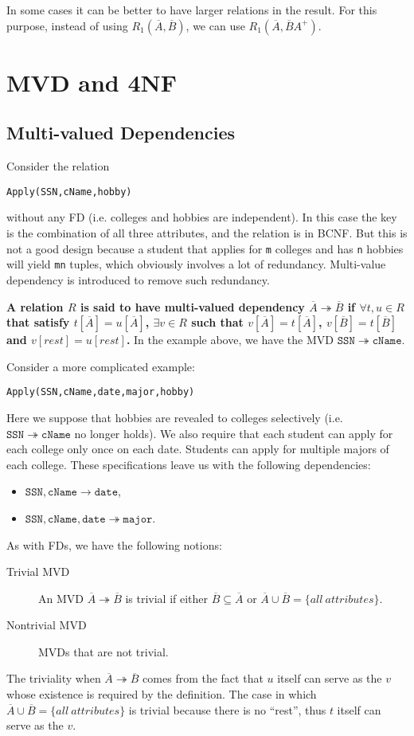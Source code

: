 In some cases it can be better to have larger relations in the result. For this purpose, instead of using $R_1(\overline{A},\overline{B})$, we can use $R_1(\overline{A},\overline{B}A^+)$.
\section{MVD and 4NF}
\subsection{Multi-valued Dependencies}
Consider the relation
\begin{lstlisting}
Apply(SSN,cName,hobby)
\end{lstlisting} 
without any FD (i.e. colleges and hobbies are independent). In this case the key is the combination of all three attributes, and the relation is in BCNF. But this is not a good design because a student that applies for \texttt{m} colleges and has \texttt{n} hobbies will yield \texttt{mn} tuples, which obviously involves a lot of redundancy. Multi-value dependency is introduced to remove such redundancy. 

\textbf{A relation $R$ is said to have multi-valued dependency $\overline{A}\twoheadrightarrow\overline{B}$ if $\forall t,u\in R$ that satisfy $t[\overline{A}]=u[\overline{A}]$, $\exists v\in R$ such that $v[\overline{A}]=t[\overline{A}]$, $v[\overline{B}]=t[\overline{B}]$ and $v[rest]=u[rest]$.} In the example above, we have the MVD $\mathtt{SSN\twoheadrightarrow cName}$.

Consider a more complicated example:
\begin{lstlisting}
Apply(SSN,cName,date,major,hobby)
\end{lstlisting}
Here we suppose that hobbies are revealed to colleges selectively (i.e. $\mathtt{SSN\twoheadrightarrow cName}$ no longer holds). We also require that each student can apply for each college only once on each date. Students can apply for multiple majors of each college. These specifications leave us with the following dependencies:
\begin{itemize}
\item $\mathtt{SSN, cName\rightarrow date}$,
\item $\mathtt{SSN, cName, date\twoheadrightarrow major}$.
\end{itemize}

As with FDs, we have the following notions:
\begin{description}
\item[Trivial MVD]An MVD $\overline{A}\twoheadrightarrow\overline{B}$ is trivial if either $\overline{B}\subseteq\overline{A}$ or $\overline{A}\cup\overline{B}=\{all\:attributes\}$.
\item[Nontrivial MVD]MVDs that are not trivial. 
\end{description}
The triviality when $\overline{A}\twoheadrightarrow\overline{B}$ comes from the fact that $u$ itself can serve as the $v$ whose existence is required by the definition. The case in which $\overline{A}\cup\overline{B}=\{all\:attributes\}$ is trivial because there is no ``rest'', thus $t$ itself can serve as the $v$.

